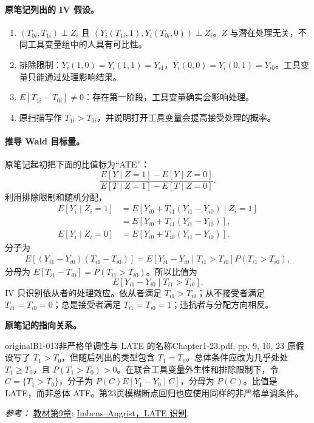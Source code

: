{\paragraph{原笔记列出的 IV 假设。}
\begin{enumerate}
\item $(T_{0i},T_{1i})\perp Z_i$ 且 $(Y_i(T_{1i},1),Y_i(T_{0i},0))\perp Z_i$。$Z$ 与潜在处理无关，不同工具变量组中的人具有可比性。
\item 排除限制：$Y_i(1,0)=Y_i(1,1)=Y_{i1}$，$Y_i(0,0)=Y_i(0,1)=Y_{i0}$。工具变量只能通过处理影响结果。
\item $E[T_{1i}-T_{0i}]\ne0$：存在第一阶段，工具变量确实会影响处理。
\item 原扫描写作 $T_{1i}>T_{0i}$，并说明打开工具变量会提高接受处理的概率。
\end{enumerate}

\paragraph{推导 Wald 目标量。}
原笔记起初把下面的比值标为“ATE”：
\[\frac{E[Y\mid Z=1]-E[Y\mid Z=0]}{E[T\mid Z=1]-E[T\mid Z=0]}.\]
利用排除限制和随机分配，
\begin{align*}
E[Y_i\mid Z_i=1]&=E[Y_{i0}+T_{i1}(Y_{i1}-Y_{i0})\mid Z_i=1]\\
&=E[Y_{i0}+T_{i1}(Y_{i1}-Y_{i0})],\\
E[Y_i\mid Z_i=0]&=E[Y_{i0}+T_{i0}(Y_{i1}-Y_{i0})].
\end{align*}
分子为
\begin{align*}
E[(Y_{i1}-Y_{i0})(T_{i1}-T_{i0})]
=E[Y_{i1}-Y_{i0}\mid T_{i1}>T_{i0}]P(T_{i1}>T_{i0}),
\end{align*}
分母为 $E[T_{i1}-T_{i0}]=P(T_{i1}>T_{i0})$。所以比值为
\[E[Y_{i1}-Y_{i0}\mid T_{i1}>T_{i0}].\]
 IV 只识别依从者的处理效应。依从者满足 $T_{i1}>T_{i0}$；从不接受者满足 $T_{i1}=T_{i0}=0$；总是接受者满足 $T_{i1}=T_{i0}=1$；违抗者与分配方向相反。

\par{}\smallskip\textbf{原笔记的指向关系。}\par\smallskip
{}
\begin{reviewnote}{original}{B1-013}{非严格单调性与 LATE 的名称}{Chapter1-23.pdf, pp. 9, 10, 23}
原假设写了 $T_1>T_0$，但随后列出的类型包含 $T_1=T_0$。总体条件应改为几乎处处 $T_1\ge T_0$，且 $P(T_1>T_0)>0$。在联合工具变量外生性和排除限制下，令 $C=\{T_1>T_0\}$，分子为 $P(C)E[Y_1-Y_0\mid C]$，分母为 $P(C)$。比值是 LATE，而非总体 ATE。第23页模糊断点回归也应使用同样的非严格单调条件。
\par\smallskip\textit{参考：} \href{https://matheusfacure.github.io/python-causality-handbook/09-Non-Compliance-and-LATE.html}{教材第9章}; \href{https://www.nber.org/papers/t0118}{Imbens--Angrist，LATE 识别}.
\end{reviewnote}
}
